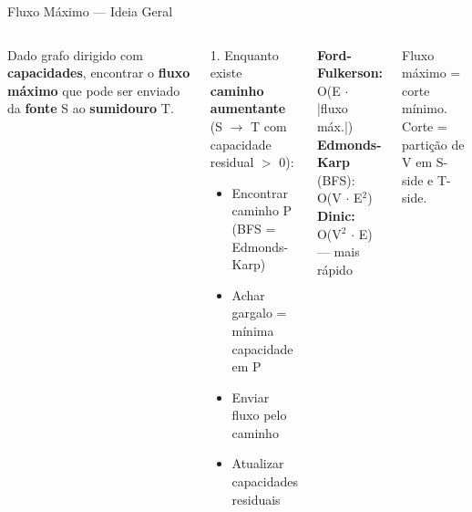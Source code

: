 \documentclass[aspectratio=169,10pt]{beamer}
\begin{document}
\begin{frame}{Fluxo Máximo --- Ideia Geral}
  \begin{columns}[c]
      \begin{tcolorbox}[caixaAzul,title={Problema}]
        \small
        Dado grafo dirigido com \textbf{capacidades},
        encontrar o \textbf{fluxo máximo} que pode
        ser enviado da \textbf{fonte} S ao \textbf{sumidouro} T.
      \end{tcolorbox}
      \vspace{0.08cm}
      \begin{tcolorbox}[caixaGrafo,title={Ford-Fulkerson (ideia)}]
        \footnotesize
        1. Enquanto existe \textbf{caminho aumentante}\\
        \quad (S $\to$ T com capacidade residual $>$ 0):
        \begin{itemize}\scriptsize
          \item Encontrar caminho P (BFS = Edmonds-Karp)
          \item Achar gargalo = mínima capacidade em P
          \item Enviar fluxo pelo caminho
          \item Atualizar capacidades residuais
        \end{itemize}
      \end{tcolorbox}
      \vspace{0.08cm}
      \begin{tcolorbox}[caixaAmarelo,title={Complexidade}]
        \footnotesize
        \textbf{Ford-Fulkerson:} O(E $\cdot$ |fluxo máx.|)\\
        \textbf{Edmonds-Karp} (BFS): O(V $\cdot$ E$^2$)\\
        \textbf{Dinic:} O(V$^2$ $\cdot$ E) --- mais rápido
      \end{tcolorbox}
      \vspace{0.08cm}
      \begin{tcolorbox}[caixaVerde,title={Teorema min-corte max-fluxo}]
        \footnotesize
        Fluxo máximo = corte mínimo.\\
        Corte = partição de V em S-side e T-side.
      \end{tcolorbox}
      \centering
\end{columns}
\end{frame}
\end{document}
